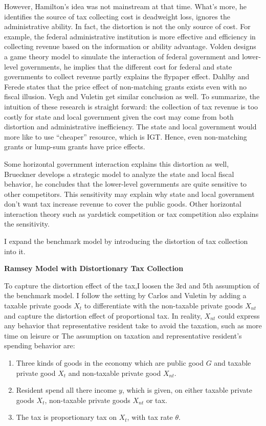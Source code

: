 However, Hamilton’s idea was not mainstream at that time. What’s more, he identifies the source of tax collecting cost is deadweight loss, ignores the administrative ability. In fact, the distortion is not the only source of cost. For example, the federal administrative institution is more effective and efficiency in collecting revenue based on the information or ability advantage.
Volden \cite{volden2007intergovernmental} designs a game theory model to simulate the interaction of federal government and lower-level governments, he implies that the different cost for federal and state governments to collect revenue partly explains the flypaper effect. Dahlby and Ferede \cite{dahlby2016stimulative} states that the price effect of non-matching grants exists even with no fiscal illusion. Vegh and Vuletin \cite{vegh2016unsticking} get similar conclusion as well. To summarize, the intuition of these research is straight forward: the collection of tax revenue is too costly for state and local government given the cost may come from both distortion and administrative inefficiency. The state and local government would more like to use “cheaper” resource, which is IGT. Hence, even non-matching grants or lump-sum grants have price effects.

Some horizontal government interaction explains this distortion as well, Brueckner \cite{brueckner2003strategic} develops a strategic model to analyze the state and local fiscal behavior, he concludes that the lower-level governments are quite sensitive to other competitors. This sensitivity may explain why state and local government don’t want tax increase revenue to cover the public goods. Other horizontal interaction theory such as yardstick competition or tax competition also explains the sensitivity.

I expand the benchmark model by introducing the distortion of tax collection into it.

\textbf{Ramsey Model with Distortionary Tax Collection}

To capture the distortion effect of the tax,I loosen the 3rd and 5th assumption of the benchmark model. I follow the setting by Carlos and Vuletin \cite{vegh2016unsticking} by adding a taxable private goods $X_t$ to differentiate with the non-taxable private goods $X_{nt}$ and capture the distortion effect of proportional tax. In reality, $X_{nt}$ could express any behavior that representative resident take to avoid the taxation, such as more time on leisure or
The assumption on taxation and representative resident's spending behavior are:
\begin{enumerate}
    \item Three kinds of goods in the economy which are public good $G$ and taxable private good $X_t$ and non-taxable private good $X_{nt}$.\label{Xt}
    \item Resident spend all there income $y$, which is given, on either taxable private goods $X_t$, non-taxable private goods $X_{nt}$ or tax.
    \item The tax is proportionary tax on $X_{t}$, with tax rate $\theta$.
\end{enumerate}


